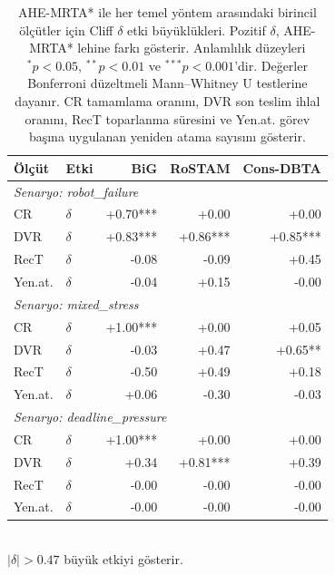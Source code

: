 \begin{table}[t]
\centering
\caption{AHE-MRTA* ile her temel yöntem arasındaki birincil ölçütler için Cliff
$\delta$ etki büyüklükleri. Pozitif $\delta$, AHE-MRTA* lehine farkı gösterir.
Anlamlılık düzeyleri $^{*}p{<}0.05$, $^{**}p{<}0.01$ ve
$^{***}p{<}0.001$'dir. Değerler Bonferroni düzeltmeli Mann--Whitney U
testlerine dayanır.
CR tamamlama oranını, DVR son teslim ihlal oranını, RecT toparlanma süresini ve
Yen.at. görev başına uygulanan yeniden atama sayısını gösterir.}
\label{tab:effectsize}
\small
\begin{tabular}{llrrr}
\toprule
\textbf{Ölçüt} & \textbf{Etki} & \textbf{BiG} & \textbf{RoSTAM} & \textbf{Cons-DBTA} \\
\midrule
\multicolumn{5}{l}{\textit{Senaryo: robot\_failure}} \\
CR & $\delta$ & +0.70*** & +0.00 & +0.00 \\
DVR & $\delta$ & +0.83*** & +0.86*** & +0.85*** \\
RecT & $\delta$ & -0.08 & -0.09 & +0.45 \\
Yen.at. & $\delta$ & -0.04 & +0.15 & -0.00 \\
\midrule
\multicolumn{5}{l}{\textit{Senaryo: mixed\_stress}} \\
CR & $\delta$ & +1.00*** & +0.00 & +0.05 \\
DVR & $\delta$ & -0.03 & +0.47 & +0.65** \\
RecT & $\delta$ & -0.50 & +0.49 & +0.18 \\
Yen.at. & $\delta$ & +0.06 & -0.30 & -0.03 \\
\midrule
\multicolumn{5}{l}{\textit{Senaryo: deadline\_pressure}} \\
CR & $\delta$ & +1.00*** & +0.00 & +0.00 \\
DVR & $\delta$ & +0.34 & +0.81*** & +0.39 \\
RecT & $\delta$ & -0.00 & -0.00 & -0.00 \\
Yen.at. & $\delta$ & -0.00 & -0.00 & -0.00 \\
\bottomrule
\end{tabular}
\\[2pt]\footnotesize $|\delta|{>}0.47$ büyük etkiyi gösterir.
\end{table}
